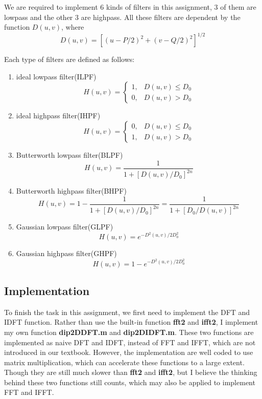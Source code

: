 \documentclass[11pt,a4paper]{article}
\begin{document}
We are required to implement 6 kinds of filters in this assignment, 3 of them are lowpass
and the other 3 are highpass. All these filters are dependent by the function $D(u,v)$,
where 
\begin{equation}
	D(u,v)=\left[(u-P/2)^2+(v-Q/2)^2\right]^{1/2}
\end{equation}

Each type of filters are defined as follows:
\begin{enumerate}
	\item ideal lowpass filter(ILPF)
	\begin{equation}
	H(u,v)=\left\{\begin{array}{ll}
		1,&D(u,v)\leq D_0\\
		0,&D(u,v)>D_0
	\end{array}\right.
\end{equation}
	\item ideal highpass filter(IHPF)
	\begin{equation}
		H(u,v)=\left\{\begin{array}{ll}
			0,&D(u,v)\leq D_0\\
			1,&D(u,v)>D_0
		\end{array}\right.
	\end{equation}
	\item Butterworth lowpass filter(BLPF)
	\begin{equation}
		H(u,v)=\frac{1}{1+\left[D(u,v)/D_0\right]^{2n}}
	\end{equation}
	\item Butterworth highpass filter(BHPF)
	\begin{equation}
		H(u,v)=1-\frac{1}{1+\left[D(u,v)/D_0\right]^{2n}}=\frac{1}{1+\left[D_0/D(u,v)\right]^{2n}}
	\end{equation}
	\item Gaussian lowpass filter(GLPF)
	\begin{equation}
		H(u,v)=e^{-D^2(u,v)/2D_0^2}
	\end{equation}
	\item Gaussian highpass filter(GHPF)
	\begin{equation}
		H(u,v)=1-e^{-D^2(u,v)/2D_0^2}
	\end{equation}
\end{enumerate}

\subsection{Implementation}
To finish the task in this assignment, we first need to implement the DFT and IDFT function.
Rather than use the built-in function \textbf{fft2} and \textbf{ifft2}, I implement 
my own function \textbf{dip2DDFT.m} and \textbf{dip2DIDFT.m}. These two functions are implemented
as naive DFT and IDFT, instead of FFT and IFFT, which are not introduced in our textbook. However,
the implementation are well coded to use matrix multiplication, which can accelerate these functions
to a large extent. Though they are still much slower than \textbf{fft2} and \textbf{ifft2}, but I believe the 
thinking behind these two functions still counts, which may also be applied to implement FFT and
IFFT.
\end{document}
